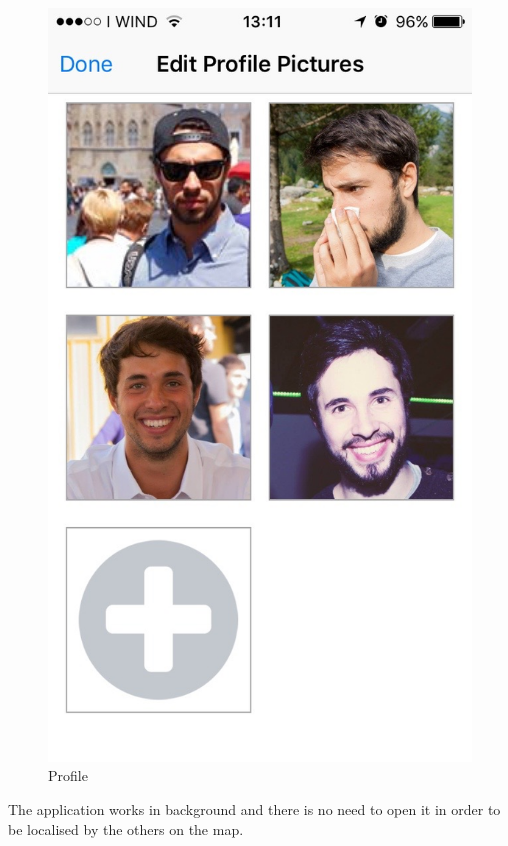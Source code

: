 \begin{multicols}{2}
\begin{figure}[H]
\centering
\includegraphics[scale=0.15]{./images/photo_selection.jpg}
\caption{\label{Profile}Profile}
\end{figure}
\end{multicols}

The application works in background and there is no need to open it in order to be localised by the others on the map.


